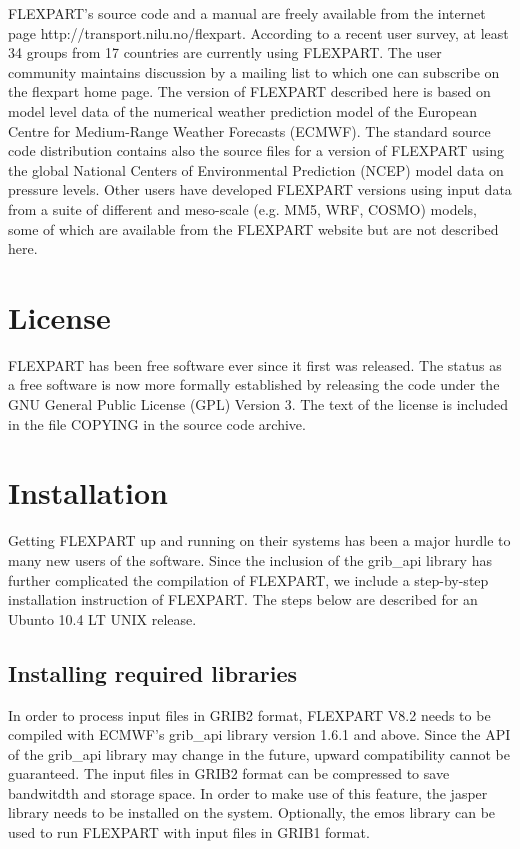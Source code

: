 \documentclass{egu}            %
\begin{document}
FLEXPART's source code and a manual are freely available from the internet page
http://transport.nilu.no/flexpart.  According to a recent user survey, at least
34 groups from 17 countries are currently using FLEXPART.  The user community
maintains discussion by a mailing list to which one can subscribe on the
flexpart home page.  The version of FLEXPART described here is based on model
level data of the numerical weather prediction model of the European Centre for
Medium-Range Weather Forecasts (ECMWF).  The standard source code distribution
contains also the source files for a version of FLEXPART using the global
National Centers of Environmental Prediction (NCEP) model data on pressure
levels.  Other users have developed FLEXPART versions using input data from a
suite of different and meso-scale (e.g.  MM5, WRF, COSMO) models, some of which
are available from the FLEXPART website but are not described here.

\section{License}

FLEXPART has been free software ever since it first was released. The status as
a free software is now more formally established by releasing the code under
the GNU General Public License (GPL) Version 3.  The text of the license is
included in the file COPYING in the source code archive.

\section{Installation}\label{sec:installation}

Getting FLEXPART up and running on their systems has been a major hurdle to many
new users of the software. Since the inclusion of the grib\_api library has further
complicated the compilation of FLEXPART, we include a step-by-step installation
instruction of FLEXPART.  The steps below are described for an Ubunto 10.4 LT
UNIX release.

\subsection{Installing required libraries}

In order to process input files in GRIB2 format, FLEXPART V8.2 needs to be
compiled with ECMWF's grib\_api library version 1.6.1 and above.  Since the API
of the grib\_api library may change in the future, upward compatibility cannot
be guaranteed.  The input files in GRIB2 format can be compressed to save
bandwitdth and storage space.  In order to make use of this feature, the jasper
library needs to be installed on the system.  Optionally, the emos library can
be used to run FLEXPART with input files in GRIB1 format.
\end{document}
